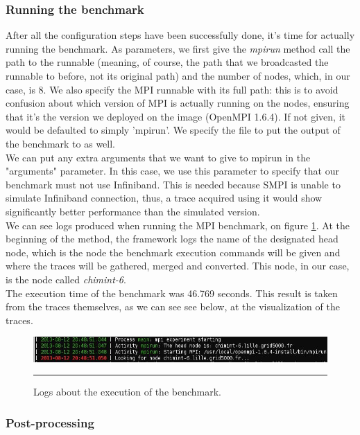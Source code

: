 \subsubsection{Running the benchmark}
After all the configuration steps have been successfully done, it's
time for actually running the benchmark. As parameters, we first give
the \emph{mpirun} method call the path to the runnable (meaning, of
course, the path that we broadcasted the runnable to before, not its
original path) and the number of nodes, which, in our case, is 8. We
also specify the MPI runnable with its full path: this is to avoid
confusion about which version of MPI is actually running on the nodes,
ensuring that it's the version we deployed on the image (OpenMPI
1.6.4). If not given, it would be defaulted to simply 'mpirun'. We
specify the file to put the output of the benchmark to as well.\\[0.3cm]
We can put any extra arguments that we want to give to mpirun in the
"arguments" parameter. In this case, we use this parameter to specify
that our benchmark must not use Infiniband. This is needed because
SMPI is unable to simulate Infiniband connection, thus, a trace
acquired using it would show significantly better performance than the
simulated version.\\[0.3cm]
We can see logs produced when running the MPI benchmark, on
figure \ref{fig:fex_mpirun}. At the beginning of the method, the
framework logs the name of the designated head node, which is the node
the benchmark execution commands will be given and where the traces
will be gathered, merged and converted. This node, in our case, is the
node called \emph{chimint-6}.\\[0.3cm]
The execution time of the benchmark was 46.769 seconds. This result is
taken from the traces themselves, as we can see see below, at the
visualization of the traces.

\begin{figure}[htbp]
  \centering
    \includegraphics[scale=0.6]{./Figures/fex_mpirun.jpg}
    \rule{35em}{0.5pt}
  \caption[Benchmark execution]{Logs about the execution of the
    benchmark.}
  \label{fig:fex_mpirun}
\end{figure}

\subsubsection{Post-processing}
